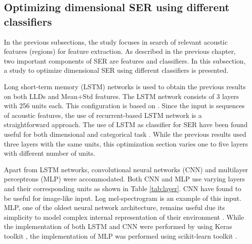 \subsection{Optimizing dimensional SER using different classifiers}
In the previous subsections, the study focuses in search of relevant acoustic 
features (regions) for feature extraction. As described in the previous
chapter, two important components of SER are features and classifiers. In this
subsection, a study to optimize dimensional SER using different classifiers is
presented. 

Long short-term memory (LSTM) networks is used to obtain the previous results
on both LLDs and Mean+Std features. The LSTM network consists of 3 layers with
256 units each. This configuration is based on \cite{Atmaja2020d}. Since the input is sequences of acoustic features, the use of
recurrent-based LSTM network is a straightforward approach. The use of LSTM as
classifier for SER have been found useful for both dimensional
\cite{Schmitt2018} and categorical task \cite{Atmaja2019}. While the previous
results used three layers with the same units, this optimization section varies
one to five layers with different number of units.

Apart from LSTM networks, convolutional neural networks (CNN) and multilayer
perceptrons (MLP) were accommodated. Both CNN and MLP use varying layers and
their corresponding units as shown in Table \ref{tab:layer}. CNN have found to
be useful for image-like input. Log mel-spectrogram is an example of this
input. MLP, one of the oldest neural network architecture, remains useful due
its simplicity to model complex internal representation of their environment
\cite{Hinton1989}. While the implementation of both LSTM and CNN were performed
by using Keras toolkit \cite{chollet2015keras}, the implementation of MLP was
performed using scikit-learn toolkit \cite{scikit-learn}.

